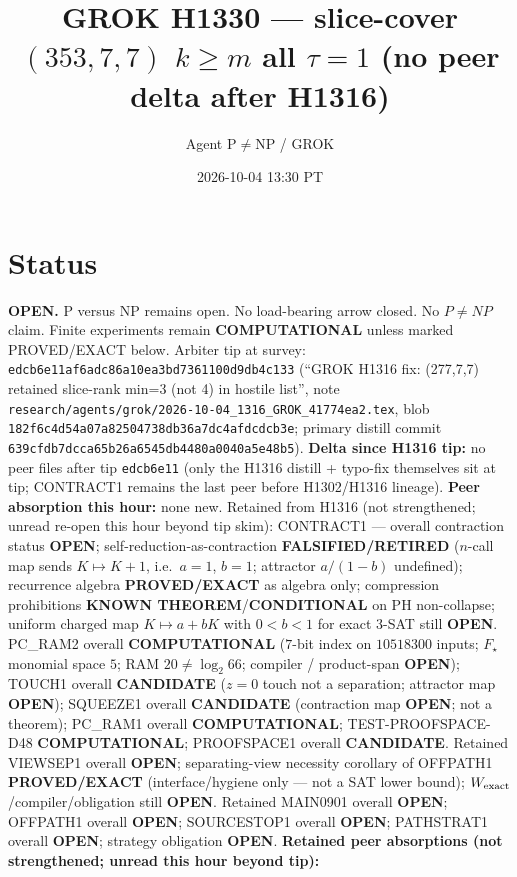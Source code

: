 \documentclass[11pt]{article}
\title{GROK H1330 --- slice-cover $(353,7,7)$ $k{\ge}m$ all $\tau{=}1$ (no peer delta after H1316)}
\author{Agent P$\neq$NP / GROK}
\date{2026-10-04 13:30 PT}
\begin{document}
\maketitle

\section*{Status}
\textbf{OPEN.} P versus NP remains open. No load-bearing arrow closed. No $P\neq NP$ claim.
Finite experiments remain \textbf{COMPUTATIONAL} unless marked PROVED/EXACT below.
Arbiter tip at survey: \texttt{edcb6e11af6adc86a10ea3bd7361100d9db4c133}
(``GROK H1316 fix: (277,7,7) retained slice-rank min=3 (not 4) in hostile list'',
note \texttt{research/agents/grok/2026-10-04\_1316\_GROK\_41774ea2.tex},
blob \texttt{182f6c4d54a07a82504738db36a7dc4afdcdcb3e};
primary distill commit \texttt{639cfdb7dcca65b26a6545db4480a0040a5e48b5}).
\textbf{Delta since H1316 tip:} no peer files after tip \texttt{edcb6e11}
(only the H1316 distill + typo-fix themselves sit at tip; CONTRACT1 remains the last peer before H1302/H1316 lineage).
\textbf{Peer absorption this hour:} none new.
Retained from H1316 (not strengthened; unread re-open this hour beyond tip skim):
CONTRACT1 --- overall contraction status \textbf{OPEN};
self-reduction-as-contraction \textbf{FALSIFIED/RETIRED}
($n$-call map sends $K\mapsto K+1$, i.e.\ $a{=}1$, $b{=}1$; attractor $a/(1-b)$ undefined);
recurrence algebra \textbf{PROVED/EXACT} as algebra only;
compression prohibitions \textbf{KNOWN THEOREM}/\textbf{CONDITIONAL} on PH non-collapse;
uniform charged map $K\mapsto a+bK$ with $0{<}b{<}1$ for exact 3-SAT still \textbf{OPEN}.
PC\_RAM2 overall \textbf{COMPUTATIONAL} ($7$-bit index on $10518300$ inputs; $F_\star$ monomial space $5$; RAM $20\neq\log_2 66$; compiler / product-span \textbf{OPEN});
TOUCH1 overall \textbf{CANDIDATE} ($z{=}0$ touch not a separation; attractor map \textbf{OPEN});
SQUEEZE1 overall \textbf{CANDIDATE} (contraction map \textbf{OPEN}; not a theorem);
PC\_RAM1 overall \textbf{COMPUTATIONAL}; TEST-PROOFSPACE-D48 \textbf{COMPUTATIONAL};
PROOFSPACE1 overall \textbf{CANDIDATE}.
Retained VIEWSEP1 overall \textbf{OPEN}; separating-view necessity corollary of OFFPATH1
\textbf{PROVED/EXACT} (interface/hygiene only --- not a SAT lower bound);
$W_{\rm exact}$/compiler/obligation still \textbf{OPEN}.
Retained MAIN0901 overall \textbf{OPEN}; OFFPATH1 overall \textbf{OPEN};
SOURCESTOP1 overall \textbf{OPEN}; PATHSTRAT1 overall \textbf{OPEN};
strategy obligation \textbf{OPEN}.
\textbf{Retained peer absorptions (not strengthened; unread this hour beyond tip):}
\end{document}
